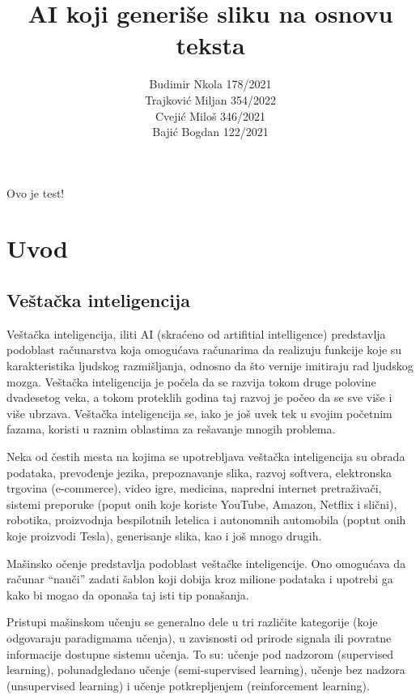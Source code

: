 \documentclass[12pt, letterpaper]{article}
\title{AI koji generiše sliku na osnovu teksta}
\author{Budimir Nkola 178/2021\\Trajković Miljan 354/2022\\Cvejić Miloš 346/2021\\Bajić Bogdan 122/2021}
\begin{document}
\maketitle
Ovo je test!

\begin{abstract}
\end{abstract}

\begin{tableofcontents}
\end{tableofcontents}

\pagebreak 

\section{Uvod} 

\subsection*{Veštačka inteligencija} 

Veštačka inteligencija, iliti AI (skraćeno od artifitial intelligence) predstavlja podoblast računarstva koja omogućava računarima da realizuju funkcije koje su karakteristika ljudskog razmišljanja, odnosno da što vernije imitiraju rad ljudskog mozga. Veštačka inteligencija je počela da se razvija tokom druge polovine dvadesetog veka, a tokom proteklih godina taj razvoj je počeo da se sve više i više ubrzava. Veštačka inteligencija se, iako je još uvek tek u svojim početnim fazama, koristi u raznim oblastima za rešavanje mnogih problema. \cite{kljucJedan} 

  

Neka od čestih mesta na kojima se upotrebljava veštačka inteligencija su obrada podataka, prevođenje jezika, prepoznavanje slika, razvoj softvera, elektronska trgovina (e-commerce), video igre, medicina, napredni internet pretraživači, sistemi preporuke (poput onih koje koriste YouTube, Amazon, Netflix i slični), robotika, proizvodnja bespilotnih letelica i autonomnih automobila (poptut onih koje proizvodi Tesla), generisanje slika, kao i još mnogo drugih.  

  

Mašinsko očenje predstavlja podoblast veštačke inteligencije. Ono omogućava da računar “nauči” zadati šablon koji dobija kroz milione podataka i upotrebi ga kako bi mogao da oponaša taj isti tip ponašanja.   

  

Pristupi mašinskom učenju se generalno dele u tri različite kategorije (koje odgovaraju paradigmama učenja), u zavisnosti od prirode signala ili povratne informacije dostupne sistemu učenja. To su: učenje pod nadzorom (supervised learning), polunadgledano učenje (semi-supervised learning), učenje bez nadzora (unsupervised learning) i učenje potkrepljenjem (reinforcement learning).  
\end{document}

